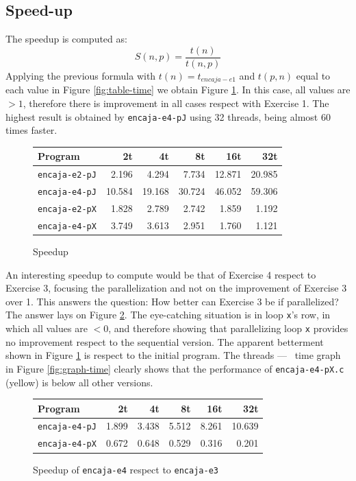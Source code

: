 \documentclass[a4paper]{article}
\begin{document}
\subsection{Speed-up}
The speedup is computed as:
$$S(n,p)=\frac{t(n)}{t(n,p)}$$
Applying the previous formula with $t(n)=t_{encaja-e1}$ and $t(p,n)$ equal to each value in Figure \ref{fig:table-time} we obtain Figure \ref{fig:table-speedup}. In this case, all values are $>1$, therefore there is improvement in all cases respect with Exercise 1. The highest result is obtained by \texttt{encaja-e4-pJ} using 32 threads, being almost 60 times faster.
\begin{figure}[h]
    \centering
    \begin{tabular}{l r r r r r}
        Program               & 2t     & 4t     & 8t     & 16t    & 32t    \\ \hline
        \texttt{encaja-e2-pJ} &  2.196 &  4.294 &  7.734 & 12.871 & 20.985 \\
        \texttt{encaja-e4-pJ} & 10.584 & 19.168 & 30.724 & 46.052 & 59.306 \\
        \texttt{encaja-e2-pX} &  1.828 &  2.789 &  2.742 &  1.859 &  1.192 \\
        \texttt{encaja-e4-pX} &  3.749 &  3.613 &  2.951 &  1.760 &  1.121 \\ \hline
    \end{tabular}
    \caption{Speedup}
    \label{fig:table-speedup}
\end{figure}

An interesting speedup to compute would be that of Exercise 4 respect to Exercise 3, focusing the parallelization and not on the improvement of Exercise 3 over 1. This answers the question: How better can Exercise 3 be if parallelized? The answer lays on Figure \ref{fig:table-speedupR3}. The eye-catching situation is in loop \texttt{x}'s row, in which all values are $<0$, and therefore showing that parallelizing loop \texttt{x} provides no improvement respect to the sequential version. The apparent betterment shown in Figure \ref{fig:table-speedup} is respect to the initial program. The threads --- \unskip \, time graph in Figure \ref{fig:graph-time} clearly shows that the performance of \texttt{encaja-e4-pX.c} (yellow) is below all other versions.

\begin{figure}[h]
    \centering
    \begin{tabular}{l r r r r r}
        Program               & 2t    & 4t    & 8t    & 16t   & 32t    \\ \hline
        \texttt{encaja-e4-pJ} & 1.899 & 3.438 & 5.512 & 8.261 & 10.639 \\
        \texttt{encaja-e4-pX} & 0.672 & 0.648 & 0.529 & 0.316 &  0.201 \\ \hline
    \end{tabular}
    \caption{Speedup of \texttt{encaja-e4} respect to \texttt{encaja-e3}}
    \label{fig:table-speedupR3}
\end{figure}
\end{document}
